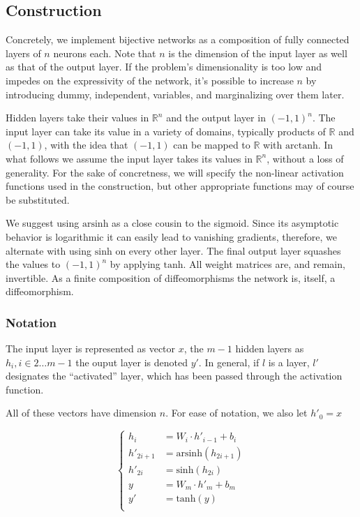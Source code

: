\documentclass{article}
\begin{document}
\subsection{Construction}

Concretely, we implement bijective networks as a composition of fully
connected layers of \(n\) neurons each. Note that \(n\) is the dimension of
the input layer as well as that of the output layer. If the problem's
dimensionality is too low and impedes on the expressivity of the network,
it's possible to increase \(n\) by introducing dummy, independent, variables,
and marginalizing over them later.

Hidden layers take their values in \(\mathbb{R}^n\) and the output layer in
\((-1,1)^n\). The input layer can take its value in a variety of domains,
typically products of \(\mathbb{R}\) and \((-1,1)\), with the idea that
\((-1, 1)\) can be mapped to \(\mathbb{R}\) with \(\mathrm{arctanh}\).
In what follows we assume the input layer takes its values in \(\mathbb{R}^n\),
without a loss of generality. For the sake of concretness, we will specify the
non-linear activation functions used in the construction, but other appropriate
functions may of course be substituted.

We suggest using \(\mathrm{arsinh}\) as a close cousin to the sigmoid. Since
its asymptotic behavior is logarithmic it can easily lead to vanishing
gradients, therefore, we alternate with using \(\mathrm{sinh}\) on every other
layer. The final output layer squashes the values to \((-1,1)^n\) by applying
\(\mathrm{tanh}\). All weight matrices are, and remain, invertible. As a
finite composition of diffeomorphisms the network is, itself, a
diffeomorphism.

\subsubsection{Notation}

The input layer is represented as vector \(x\), the \(m-1\) hidden layers as
\(h_i, i \in 2 \ldots m-1 \) the ouput layer is denoted \(y'\). In general,
if \(l\) is a layer, \(l'\) designates the ``activated'' layer, which has been
passed through the activation function.

All of these vectors have dimension \(n\). For ease of notation, we also let
\(h'_0 = x\)

\[
  \left\{
    \begin{aligned}
      h_{i} &= W_{i} \cdot  h'_{i-1} + b_{i} \\
      h'_{2i+1} &= \mathrm{arsinh}(h_{2i+1}) \\
      h'_{2i} &= \mathrm{sinh}(h_{2i}) \\
      y &= W_{m} \cdot h'_m + b_m  \\
      y' &= \mathrm{tanh}(y) \\
    \end{aligned}
  \right.
\]
\end{document}
